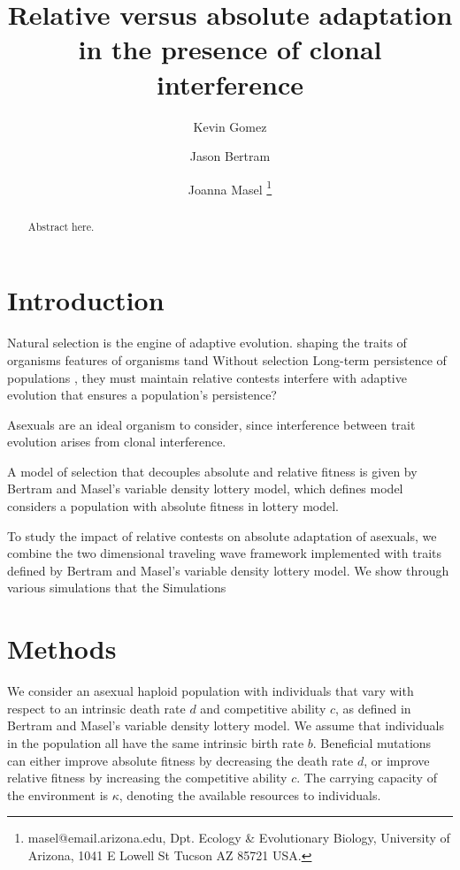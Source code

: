 \documentclass[9pt,twocolumn,twoside]{article}
\begin{document}
\title{Relative versus absolute adaptation in the presence of clonal interference}
\author[$\ast$]{Kevin Gomez}
\author[$\dagger$]{Jason Bertram}
\author[,$\ddagger$]{Joanna Masel \thanks{masel@email.arizona.edu, Dpt. Ecology \& Evolutionary Biology, University of Arizona, 1041 E Lowell St Tucson AZ 85721 USA.}}


\maketitle
\begin{abstract}
Abstract here.
\end{abstract}

\section{Introduction}
Natural selection is the engine of adaptive evolution. shaping the traits of organisms features of organisms tand  Without selection Long-term persistence of populations  , they must maintain relative contests interfere with adaptive evolution that ensures a population's persistence?

Asexuals are an ideal organism to consider, since interference between trait evolution arises from clonal interference. 

A model of selection that decouples absolute and relative fitness is given by Bertram and Masel's \citep{bertram2019density} variable density lottery model, which defines model considers a population with absolute fitness in \citet{bertram2019density} lottery model.

To study the impact of relative contests on absolute adaptation of asexuals, we combine the two dimensional traveling wave framework implemented with traits defined by Bertram and Masel's variable density lottery model. We show through various simulations that the Simulations

\section{Methods}
We consider an asexual haploid population with individuals that vary with respect to an intrinsic death rate $d$ and competitive ability $c$, as defined in Bertram and Masel's \citep{bertram2019density} variable density lottery model. We assume that individuals in the population all have the same intrinsic birth rate $b$. Beneficial mutations can either improve absolute fitness by decreasing the death rate $d$, or improve relative fitness by increasing the competitive ability $c$. The carrying capacity of the environment is $\kappa$, denoting the available resources to individuals.
\end{document}
